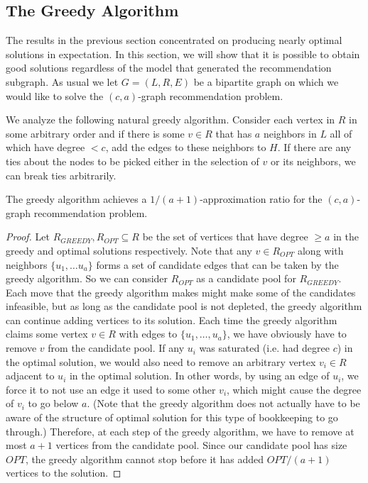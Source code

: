 \subsection{The Greedy Algorithm}
\label{greedy}
The results in the previous section concentrated on producing nearly
optimal solutions in expectation. In this section, we will show that
it is possible to obtain good solutions regardless of the model that
generated the recommendation subgraph. As usual we let $G=(L,R,E)$ be a
bipartite graph on which we would like to solve the $(c,a)$-graph
recommendation problem. 

We analyze the following natural greedy algorithm. Consider each vertex in $R$ in some arbitrary order and if there is some $v \in R$ that has $a$ neighbors in $L$ all of which have degree $< c$, add the edges to these neighbors to $H$. If there
are any ties about the nodes to be picked either in the selection of
$v$ or its neighbors, we can break ties arbitrarily. 

\begin{thm}
The greedy algorithm achieves a $1/(a+1)$-approximation ratio for the $(c,a)$-graph
recommendation problem.
\end{thm}
\begin{proof}
Let $R_{GREEDY}, R_{OPT}\subseteq R$ be the set of vertices that have
degree $\geq a$ in the greedy and optimal solutions respectively. Note
that any $v \in R_{OPT}$ along with neighbors $\{u_1,\ldots u_a\}$
forms a set of candidate edges that can be taken by the greedy
algorithm. So we can consider $R_{OPT}$ as a candidate pool for
$R_{GREEDY}$. Each move that the greedy algorithm makes might make
some of the candidates infeasible, but as long as the candidate pool
is not depleted, the greedy algorithm can continue adding vertices to
its solution. Each time the greedy algorithm claims some vertex $v\in
R$ with edges to $\{u_1,\ldots, u_a\}$, we have obviously have to
remove $v$ from the candidate pool. If any $u_i$ was saturated
(i.e. had degree $c$) in the optimal solution, we would also need to
remove an arbitrary vertex $v_i\in R$ adjacent to $u_i$ in the optimal
solution. In other words, by using an edge of $u_i$, we force it to
not use an edge it used to some other $v_i$, which might cause the
degree of $v_i$ to go below $a$. (Note that the greedy algorithm does
not actually have to be aware of the structure of optimal solution for
this type of bookkeeping to go through.) Therefore, at each step of
the greedy algorithm, we have to remove at most $a+1$ vertices from
the candidate pool. Since our candidate pool has size $OPT$, the
greedy algorithm cannot stop before it has added $OPT/(a+1)$
vertices to the solution.
\end{proof}

